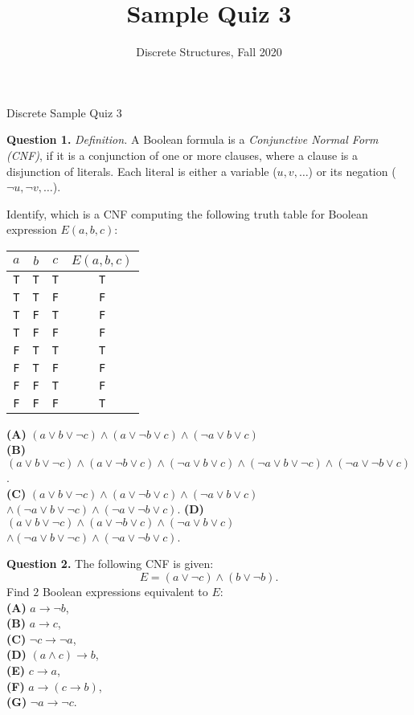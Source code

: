 \documentclass[jou]{apa6}
\title{Sample Quiz 3}
\author{Discrete Structures, Fall 2020}
\affiliation{RBS}
\begin{document}
\thispagestyle{empty}

\twocolumn
{\Large Discrete Sample Quiz 3}

\vspace{6pt}
{\bf Question 1.} {\em Definition.} A Boolean formula is a 
{\em Conjunctive Normal Form (CNF)}, 
if it is a conjunction of one or more clauses, 
where a clause is a disjunction of literals. Each literal 
is either a variable ($u,v,\ldots$) or its negation ($\neg u, \neg v, \ldots$). 

Identify, which is a CNF computing the following truth table for Boolean 
expression $E(a,b,c)$:\\
\begin{tabular}{ c | c | c | c }
$a$ & $b$ & $c$ & $E(a,b,c)$  \\ \hline
{\tt T} & {\tt T} & {\tt T} & {\tt T} \\ \hline
{\tt T} & {\tt T} & {\tt F} & {\tt F} \\ \hline
{\tt T} & {\tt F} & {\tt T} & {\tt F} \\ \hline
{\tt T} & {\tt F} & {\tt F} & {\tt F} \\ \hline
{\tt F} & {\tt T} & {\tt T} & {\tt T} \\ \hline
{\tt F} & {\tt T} & {\tt F} & {\tt F} \\ \hline
{\tt F} & {\tt F} & {\tt T} & {\tt F} \\ \hline
{\tt F} & {\tt F} & {\tt F} & {\tt T} \\ \hline
\end{tabular}

\noindent
{\bf (A)} $(a \vee b \vee \neg c) \wedge (a \vee \neg b \vee c) \wedge (\neg a \vee b \vee c)$\\
{\bf (B)} $(a \vee b \vee \neg c) \wedge (a \vee \neg b \vee c)
\wedge (\neg a \vee b \vee c) \wedge (\neg a \vee b \vee \neg c) \wedge (\neg a \vee \neg b \vee c)$.\\
{\bf (C)} $(a \vee b \vee \neg c) \wedge (a \vee \neg b \vee c) \wedge (\neg a \vee b \vee c)$\\
$\wedge (\neg a \vee b \vee \neg c) \wedge (\neg a \vee \neg b \vee c)$.
{\bf (D)} $(a \vee b \vee \neg c) \wedge (a \vee \neg b \vee c) \wedge (\neg a \vee b \vee c)$\\
$\wedge (\neg a \vee b \vee \neg c) \wedge (\neg a \vee \neg b \vee c)$.



\vspace{6pt}
{\bf Question 2.} The following CNF is given:
$$E = (a \vee \neg c) \wedge (b \vee \neg b).$$
Find $2$ Boolean expressions equivalent to $E$:\\
{\bf (A)} $a \rightarrow \neg b$,\\
{\bf (B)} $a \rightarrow c$,\\
{\bf (C)} $\neg c \rightarrow \neg a$,\\
{\bf (D)} $(a \wedge c) \rightarrow b$,\\
{\bf (E)} $c \rightarrow a$,\\
{\bf (F)} $a \rightarrow (c \rightarrow b)$,\\
{\bf (G)} $\neg a \rightarrow \neg c$.
\end{document}
